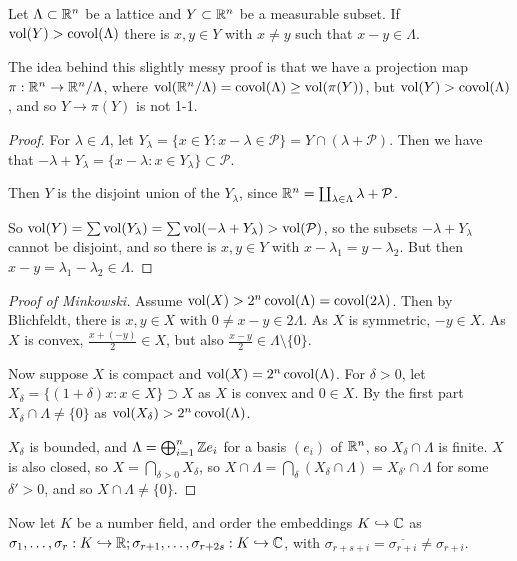 \documentclass[10pt,a4paper]{article}
\begin{document}
\begin{lemma}
Let $\Lambda \subset \mathbb{R}^n$ be a lattice and $Y \subset \mathbb{R}^n$ be a measurable subset. If $\operatorname{vol}(Y)> \operatorname{covol}(\Lambda)$ there is $x, y \in Y$ with $x\neq y$ such that $x-y \in \Lambda$.
\end{lemma}
The idea behind this slightly messy proof is that we have a projection map $\pi:\mathbb{R}^n\to \mathbb{R}^n/\Lambda$, where $\operatorname{vol}(\mathbb{R}^n/\Lambda) = \operatorname{covol}(\Lambda) \geq \operatorname{vol}(\pi(Y))$,  but $\operatorname{vol}(Y) > \operatorname{covol}(\Lambda)$, and so $Y\to \pi(Y)$ is not 1-1.
\begin{proof}
For $\lambda \in \Lambda$, let $Y_{\lambda} = \{x \in Y : x-\lambda \in \mathcal{P}\} = Y \cap (\lambda+\mathcal{P})$. Then we have that $-\lambda + Y_{\lambda} = \{x-\lambda:x \in Y_\lambda\} \subset \mathcal{P}$.

Then $Y$ is the disjoint union of the $Y_{\lambda}$, since $\mathbb{R}^n = \coprod_{\lambda\in \Lambda} \lambda + \mathcal{P}$.

So $\operatorname{vol}(Y) = \sum \operatorname{vol}(Y_\lambda) = \sum \operatorname{vol}(-\lambda + Y_\lambda) > \operatorname{vol}(\mathcal{P})$, so the subsets $-\lambda + Y_\lambda$ cannot be disjoint, and so there is $x, y \in Y$ with $x - \lambda_1 = y-\lambda_2$. But then $x-y = \lambda_1-\lambda_2 \in \Lambda$.
\end{proof}

\begin{proof}[Proof of Minkowski]
Assume $\operatorname{vol}(X) > 2^n\operatorname{covol}(\Lambda) = \operatorname{covol}(2\lambda)$. Then by Blichfeldt, there is $x,y \in X$ with $0 \neq x - y \in 2\Lambda$. As $X$ is symmetric, $-y \in X$. As $X$ is convex, $\frac{x+(-y)}{2} \in X$, but also $\frac{x-y}{2} \in \Lambda\setminus \{0\}$.

Now suppose $X$ is compact and $\operatorname{vol}(X) = 2^n \operatorname{covol}(\Lambda)$. For $\delta > 0$, let $X_\delta = \{(1+\delta)x : x \in X\} \supset X$ as $X$ is convex and $0 \in X$. By the first part $X_{\delta} \cap \Lambda \neq \{0\}$ as $\operatorname{vol}(X_{\delta}) > 2^n\operatorname{covol}(\Lambda)$. 

$X_\delta$ is bounded, and $\Lambda = \bigoplus_{i=1}^n \mathbb{Z} e_i$ for a basis $(e_i)$ of $\mathbb{R}^n$, so $X_\delta \cap \Lambda$ is finite. $X$ is also closed, so $X = \bigcap_{\delta>0} X_\delta$, so $X \cap \Lambda= \bigcap_{\delta} (X_\delta \cap \Lambda) = X_{\delta'} \cap \Lambda$ for some $\delta' >0$, and so $X \cap \Lambda \neq \{0\}$.
\end{proof}

Now let $K$ be a number field, and order the embeddings $K \hookrightarrow \mathbb{C}$ as $\sigma_1, \ldots, \sigma_r:K \hookrightarrow \mathbb{R}; \sigma_{r+1},\ldots,\sigma_{r+2s}:K \hookrightarrow \mathbb{C}$, with $\sigma_{r+s+i} = \overline{\sigma_{r+i}}\neq \sigma_{r+i}$.
\end{document}
